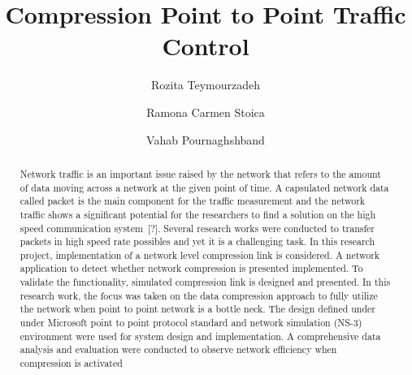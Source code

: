 \documentclass[sigconf]{acmart}
\begin{document}
\title{Compression Point to Point Traffic Control}

\author{Rozita Teymourzadeh}
\authornotemark[1]

\author{Ramona Carmen Stoica}
\authornotemark[2]

\author{Vahab Pournaghshband}
\authornotemark[3]

\renewcommand{\shortauthors}{Trovato and Tobin, et al.}

\begin{abstract}
Network traffic is an important issue raised by the network that refers to 
the amount of data moving across a network at the given point of time. 
A capsulated network data called packet is the main component for the 
traffic measurement and the network traffic shows a significant potential
for the researchers to find a solution on the high speed communication 
system\ [?].  Several research works were conducted to transfer packets 
in high speed rate possibles and yet it is a challenging task.  In this research project, implementation of a network level compression link is considered. A network application to detect whether network compression is presented implemented. To validate the functionality, simulated compression link is designed and presented. In this research 
work, the focus was taken on the data compression approach to fully utilize 
the network when point to point network is a bottle neck. The design defined 
under under Microsoft  point to point protocol standard and network simulation 
(NS-3) environment were used for system design and implementation. 
A comprehensive data analysis and evaluation were conducted to observe 
network efficiency when compression is activated 
\end{abstract}
\end{document}
